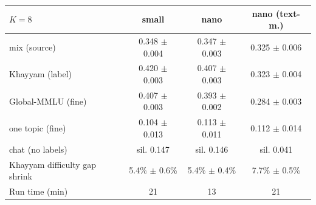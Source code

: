 \begin{tabular}{lccc}
\toprule
$K = 8$ & small & nano & nano (text-m.) \\
\midrule
mix (source) & 0.348 $\pm$ 0.004 & 0.347 $\pm$ 0.003 & 0.325 $\pm$ 0.006 \\
Khayyam (label) & 0.420 $\pm$ 0.003 & 0.407 $\pm$ 0.003 & 0.323 $\pm$ 0.004 \\
Global-MMLU (fine) & 0.407 $\pm$ 0.003 & 0.393 $\pm$ 0.002 & 0.284 $\pm$ 0.003 \\
one topic (fine) & 0.104 $\pm$ 0.013 & 0.113 $\pm$ 0.011 & 0.112 $\pm$ 0.014 \\
chat (no labels) & sil. 0.147 & sil. 0.146 & sil. 0.041 \\
Khayyam difficulty gap shrink & 5.4\% $\pm$ 0.6\% & 5.4\% $\pm$ 0.4\% & 7.7\% $\pm$ 0.5\% \\
Run time (min) & 21 & 13 & 21 \\
\bottomrule
\end{tabular}
